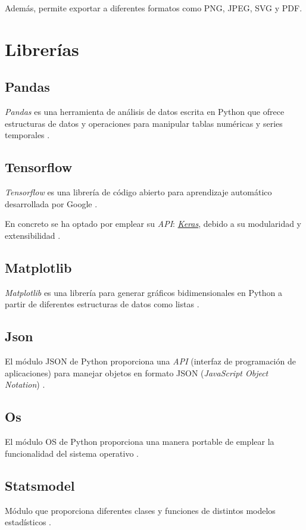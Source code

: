 Además, permite exportar a diferentes formatos como PNG, JPEG, SVG y PDF.

\section{Librerías}
\subsection{Pandas}
\textit{Pandas} es una herramienta de análisis de datos escrita en Python que ofrece estructuras 
de datos y operaciones para manipular tablas numéricas y series temporales 
\cite{eswiki:pandas2023}.

\subsection{Tensorflow}
\textit{Tensorflow} es una librería de código abierto para aprendizaje automático desarrollada
por Google \cite{eswiki:tensorflow2021}.

En concreto se ha optado por emplear su \textit{API}: \href{https://keras.io/}{\textit{Keras}}, 
debido a su modularidad y extensibilidad \cite{eswiki:keras2022}.

\subsection{Matplotlib}
\textit{Matplotlib} es una librería para generar gráficos bidimensionales en Python a partir de 
diferentes estructuras de datos como listas \cite{eswiki:matplotlib2022}.

\subsection{Json}
El módulo JSON de Python proporciona una \textit{API} (interfaz de programación de 
aplicaciones) para manejar objetos en formato JSON (\textit{JavaScript Object 
Notation}) \cite{python:json2023}.

\subsection{Os}
El módulo OS de Python proporciona una manera portable de emplear la funcionalidad del
sistema operativo \cite{python:os2023}.

\subsection{Statsmodel}
Módulo que proporciona diferentes clases y funciones de distintos modelos estadísticos \cite{misc:perktold2023}.

